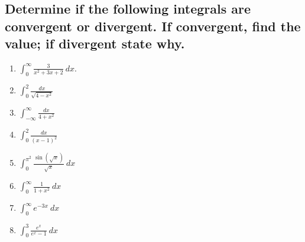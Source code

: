 \documentclass{article}
\begin{document}
\subsection{Determine if the following integrals are convergent or divergent. If convergent, find the value; if divergent state why.}

\begin{multicols}{4}
\begin{enumerate}
\item $\displaystyle \int_0^{\infty} \frac{3}{x^2+3x+2}\ dx$.
\item $\displaystyle \int_0^2 \frac{d x}{\sqrt{4-x^2}}$
\item $\displaystyle \int_{-\infty}^{\infty} \frac{d x}{4+x^2}$
\item $\displaystyle \int_0^2 \frac{d x}{(x-1)^2}$
\item $\displaystyle \int_0^{\pi^2} \frac{\sin (\sqrt{x})}{\sqrt{x}}\ d x$
\item $\displaystyle \int_0^{\infty} \frac{1}{1+x^2} \ d x$
\item $\displaystyle \int_0^{\infty} e^{-3x} \ d x$
\item $\displaystyle \int_0^{3} \frac{e^x}{e^x-1} \ d x$

\end{enumerate}
\end{multicols}
\end{document}
